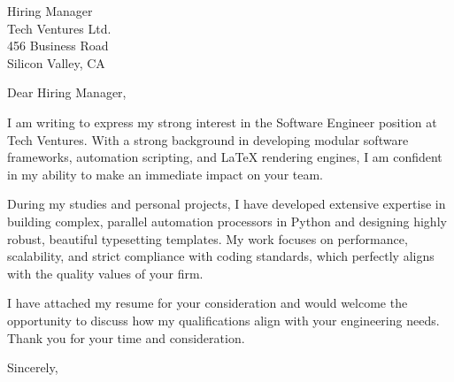 \documentclass[11pt,a4paper]{letter}
\begin{document}
\begin{letter}{Hiring Manager \\ Tech Ventures Ltd. \\ 456 Business Road \\ Silicon Valley, CA}

\opening{Dear Hiring Manager,}

I am writing to express my strong interest in the Software Engineer position at Tech Ventures. With a strong background in developing modular software frameworks, automation scripting, and LaTeX rendering engines, I am confident in my ability to make an immediate impact on your team.

During my studies and personal projects, I have developed extensive expertise in building complex, parallel automation processors in Python and designing highly robust, beautiful typesetting templates. My work focuses on performance, scalability, and strict compliance with coding standards, which perfectly aligns with the quality values of your firm.

I have attached my resume for your consideration and would welcome the opportunity to discuss how my qualifications align with your engineering needs. Thank you for your time and consideration.

\closing{Sincerely,}
\end{letter}
\end{document}
